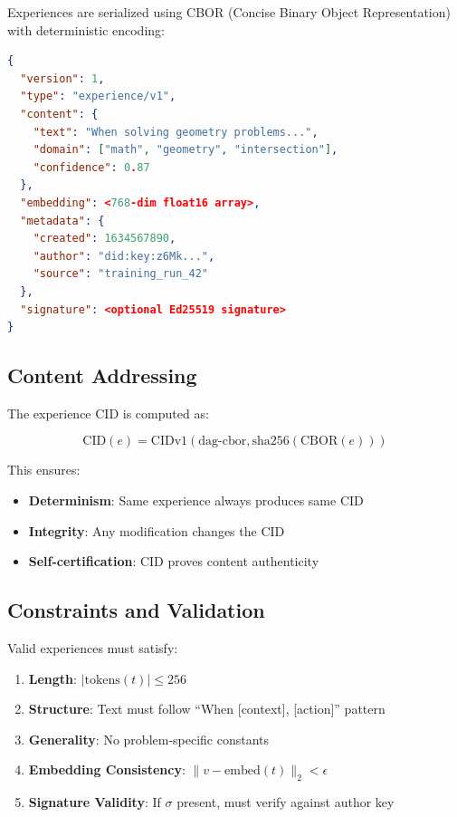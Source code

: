 \documentclass[11pt,letterpaper]{article}
\begin{document}
Experiences are serialized using CBOR (Concise Binary Object Representation) with deterministic encoding:

\begin{lstlisting}[language=json,caption=Experience CBOR Schema]
{
  "version": 1,
  "type": "experience/v1",
  "content": {
    "text": "When solving geometry problems...",
    "domain": ["math", "geometry", "intersection"],
    "confidence": 0.87
  },
  "embedding": <768-dim float16 array>,
  "metadata": {
    "created": 1634567890,
    "author": "did:key:z6Mk...",
    "source": "training_run_42"
  },
  "signature": <optional Ed25519 signature>
}
\end{lstlisting}

\subsection{Content Addressing}

The experience CID is computed as:

\begin{equation}
\text{CID}(e) = \text{CIDv1}(\text{dag-cbor}, \text{sha256}(\text{CBOR}(e)))
\end{equation}

This ensures:
\begin{itemize}
    \item \textbf{Determinism}: Same experience always produces same CID
    \item \textbf{Integrity}: Any modification changes the CID
    \item \textbf{Self-certification}: CID proves content authenticity
\end{itemize}

\subsection{Constraints and Validation}

Valid experiences must satisfy:

\begin{enumerate}
    \item \textbf{Length}: $|\text{tokens}(t)| \leq 256$
    \item \textbf{Structure}: Text must follow ``When [context], [action]'' pattern
    \item \textbf{Generality}: No problem-specific constants
    \item \textbf{Embedding Consistency}: $\|v - \text{embed}(t)\|_2 < \epsilon$
    \item \textbf{Signature Validity}: If $\sigma$ present, must verify against author key
\end{enumerate}
\end{document}
